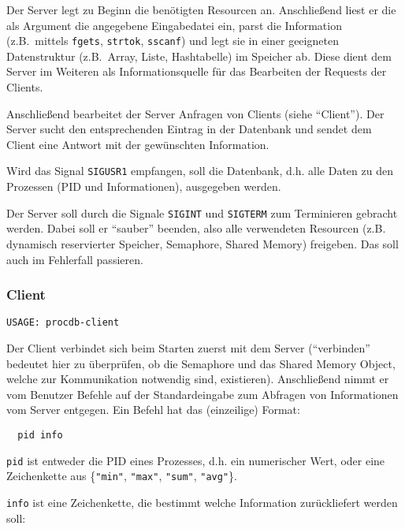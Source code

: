 Der Server legt zu Beginn die benötigten Resourcen an. Anschließend liest er
die als Argument die angegebene Eingabedatei ein, parst die Information (z.B.\
mittels \texttt{fgets}, \texttt{strtok}, \texttt{sscanf}) und legt sie in einer
geeigneten Datenstruktur (z.B.\ Array, Liste, Hashtabelle) im Speicher ab.
Diese dient dem Server im Weiteren als Informationsquelle für das Bearbeiten
der Requests der Clients.

Anschließend bearbeitet der Server Anfragen von Clients (siehe "`Client"'). Der
Server sucht den entsprechenden Eintrag in der Datenbank und sendet dem Client
eine Antwort mit der gewünschten Information.


Wird das Signal \texttt{SIGUSR1} empfangen, soll die Datenbank, d.h. alle Daten
zu den Prozessen (PID und Informationen), ausgegeben werden.

Der Server soll durch die Signale \texttt{SIGINT} und \texttt{SIGTERM} zum
Terminieren gebracht werden. Dabei soll er "`sauber"' beenden, also alle
verwendeten Resourcen (z.B. dynamisch reservierter Speicher, Semaphore, Shared
Memory) freigeben. Das soll auch im Fehlerfall passieren.


\subsubsection*{Client}
\begin{verbatim}
USAGE: procdb-client
\end{verbatim}


Der Client verbindet sich beim Starten zuerst mit dem Server ("`verbinden"'
bedeutet hier zu überprüfen, ob die Semaphore und das Shared Memory Object,
welche zur Kommunikation notwendig sind, existieren). Anschließend nimmt er vom
Benutzer Befehle auf der Standardeingabe zum Abfragen von Informationen vom
Server entgegen. Ein Befehl hat das (einzeilige) Format:

\begin{verbatim}
  pid info
\end{verbatim}

\texttt{pid} ist entweder die PID eines Prozesses, d.h. ein numerischer Wert,
oder eine Zeichenkette aus \{\texttt{"{}min"}, \texttt{"{}max"},
\texttt{"{}sum"}, \texttt{"{}avg"}\}.

\texttt{info} ist eine Zeichenkette, die bestimmt welche Information
zurückliefert werden soll:

